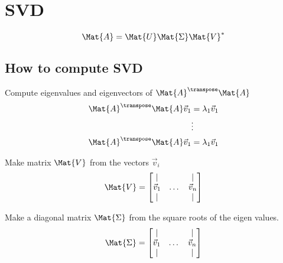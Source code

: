 \section{SVD}

\begin{equation}
  \Mat{A} = \Mat{U} \Mat{\Sigma} \Mat{V}^{\ast}
\end{equation}

\subsection{How to compute SVD}

\begin{enumerate}
  \begin{itemize}
    Compute eigenvalues and eigenvectors of $\Mat{A}^{\transpose} \Mat{A}$
    \begin{equation}
      \begin{aligned}
        \Mat{A}^{\transpose} \Mat{A} \Vec{v}_{1} &= \lambda_{1} \Vec{v}_{1} \\
        &\vdots \\
        \Mat{A}^{\transpose} \Mat{A} \Vec{v}_{1} &= \lambda_{1} \Vec{v}_{1} \\
      \end{aligned}
    \end{equation}
  \end{itemize}

  \begin{itemize}
    Make matrix $\Mat{V}$ from the vectors $\Vec{v}_{i}$
    \begin{equation}
      \Mat{V} =
        \begin{bmatrix}
          \vert &  & \vert \\
          \Vec{v}_{1} & \dots  & \Vec{v}_{n} \\
          \vert &  & \vert \\
        \end{bmatrix}
    \end{equation}
  \end{itemize}

  \begin{itemize}
    Make a diagonal matrix $\Mat{\Sigma}$ from the square roots of the eigen
    values.
    \begin{equation}
      \Mat{\Sigma} =
        \begin{bmatrix}
          \vert &  & \vert \\
          \Vec{v}_{1} & \dots  & \Vec{v}_{n} \\
          \vert &  & \vert \\
        \end{bmatrix}
    \end{equation}
  \end{itemize}


\end{enumerate}
